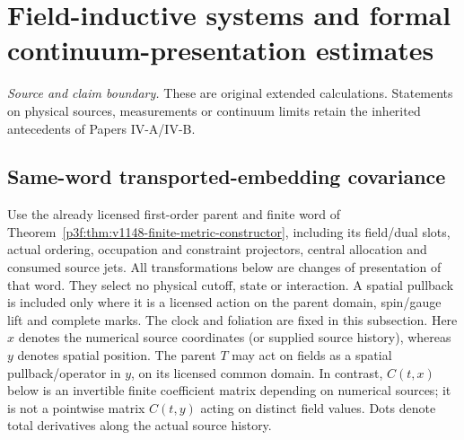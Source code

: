 \documentclass[12pt,a4paper]{article}
\begin{document}




\section{Field-inductive systems and formal continuum-presentation estimates}
\label{p4c:sec:v238-c4}
\noindent\textit{Source and claim boundary.} These are original extended calculations. Statements on physical sources, measurements or continuum limits retain the inherited antecedents of Papers IV-A/IV-B.

\subsection{Same-word transported-embedding covariance}
\label{p4:sec:v4118-transported-embedding-covariance}
Use the already licensed first-order parent and finite word of
Theorem~\ref{p3f:thm:v1148-finite-metric-constructor}, including its
field/dual slots, actual ordering, occupation and constraint projectors,
central allocation and consumed source jets. All transformations below
are changes of presentation of that word. They select no physical cutoff,
state or interaction. A spatial pullback is included only where it is a
licensed action on the parent domain, spin/gauge lift and complete marks.
The clock and foliation are fixed in this subsection. Here $x$ denotes
the numerical source coordinates (or supplied source history), whereas
$y$ denotes spatial position. The parent $T$ may act on fields as a
spatial pullback/operator in $y$, on its licensed common domain. In
contrast, $C(t,x)$ below is an invertible finite coefficient matrix
depending on numerical sources; it is not a pointwise matrix $C(t,y)$
acting on distinct field values. Dots denote total derivatives along
the actual source history.
\end{document}
